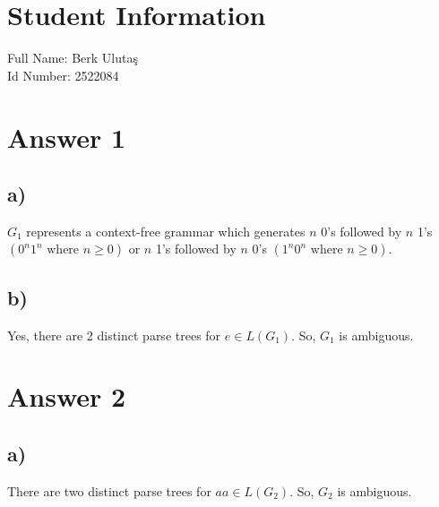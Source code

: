 \documentclass[12pt]{article}
\begin{document}
\section*{Student Information}
Full Name: Berk Ulutaş \\
Id Number: 2522084 \\

\section*{Answer 1}
\subsection*{a)}
$G_1$ represents a context-free grammar which generates $n$ 0's followed by $n$ 1's $(0^n1^n \text{ where } n \geq 0)$ or $n$ 1's followed by $n$ 0's $(1^n0^n \text{ where } n \geq 0)$.
\subsection*{b)}
Yes, there are 2 distinct parse trees for $e \in L(G_1)$. So, $G_1$ is ambiguous. \\ 

\begin{minipage}{0.4\textwidth}
\end{minipage}
\begin{minipage}{0.4\textwidth}
\end{minipage}


\section*{Answer 2}
\subsection*{a)}
There are two distinct parse trees for $aa \in L(G_2)$. So, $G_2$ is ambiguous. \\

\begin{minipage}{0.4\textwidth}
\end{minipage}
\begin{minipage}{0.4\textwidth}
\end{minipage}
\end{document}
